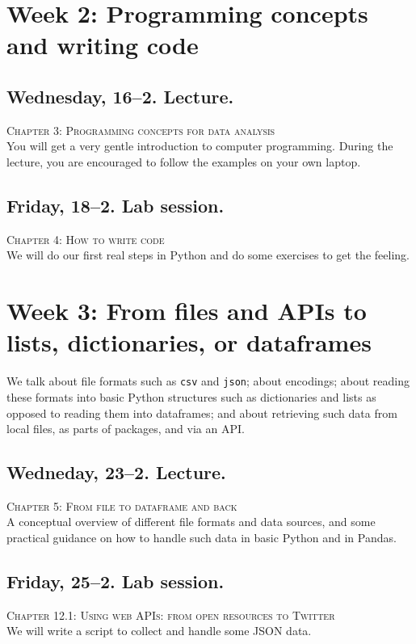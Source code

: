 
\section*{Week 2: Programming concepts and writing code}

\subsection*{Wednesday, 16--2. Lecture.}
\textsc{ Chapter 3: Programming concepts for data analysis}\\
You will get a very gentle introduction to computer programming. During the lecture, you are encouraged to follow the examples on your own laptop.


\subsection*{Friday, 18--2. Lab session.}
\textsc{ Chapter 4: How to write code}\\
We will do our first real steps in Python and do some exercises to get the feeling.



\section*{Week 3: From files and APIs to lists, dictionaries, or dataframes}
We talk about file formats such as \texttt{csv} and \texttt{json}; about encodings; about reading these formats into basic Python structures such as dictionaries and lists as opposed to reading them into dataframes; and about retrieving such data from local files, as parts of packages, and via an API.


\subsection*{Wedneday, 23--2. Lecture.}
\textsc{ Chapter 5: From file to dataframe and back}\\
A conceptual overview of different file formats and data sources, and some practical guidance on how to handle such data in basic Python and in Pandas.

\subsection*{Friday, 25--2. Lab session.}
\textsc{ Chapter 12.1: Using web APIs: from open resources to Twitter}\\
We will write a script to collect and handle some JSON data.


